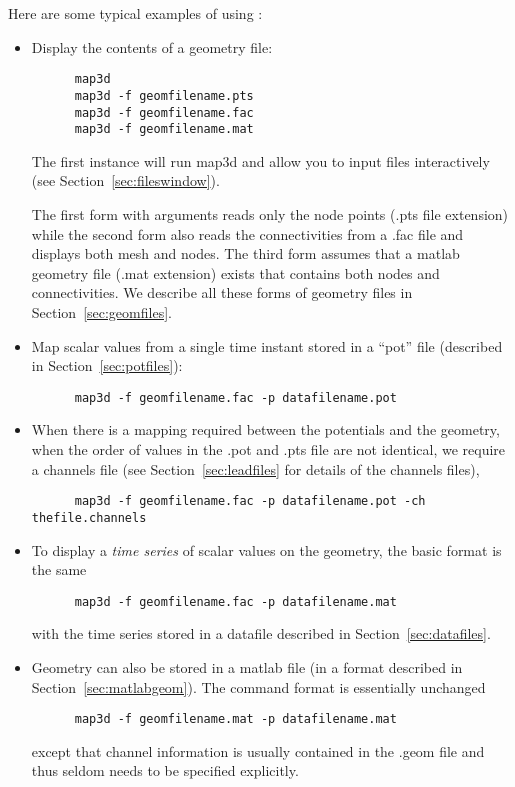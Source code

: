 \noindent
Here are some typical examples of using \map{}:
%
\begin{itemize}
  \item Display the contents of a geometry file:
  \begin{verbatim}
      map3d
      map3d -f geomfilename.pts
      map3d -f geomfilename.fac
      map3d -f geomfilename.mat

  \end{verbatim}
  \vspace{-.2in}
  The first instance will run map3d and allow you to input files interactively
  (see Section~\ref{sec:fileswindow}).
  
  The first form with arguments reads only the node points (.pts file
  extension) while the second form also reads the connectivities from a
  .fac file and displays both mesh and nodes.  The third form assumes that
  a matlab geometry file (.mat extension) exists that contains both nodes
  and connectivities.  We describe all these forms of geometry files in
  Section~\ref{sec:geomfiles}.
  
  \item Map scalar values from a single time instant stored in a ``pot''
  file (described in Section~\ref{sec:potfiles}):
  \begin{verbatim}
      map3d -f geomfilename.fac -p datafilename.pot
  \end{verbatim}

  \item When there is a mapping required between the potentials and the 
  geometry, \eg{} when the order of values in the .pot and .pts file 
  are not identical, we require a channels file (see 
  Section~\ref{sec:leadfiles} for details of the channels files),
  \begin{verbatim}
      map3d -f geomfilename.fac -p datafilename.pot -ch thefile.channels
  \end{verbatim}
   
  \item To display a \emph{time series} of scalar values on the geometry, 
  the basic format is the same
  \begin{verbatim}
      map3d -f geomfilename.fac -p datafilename.mat
  \end{verbatim}
  \vspace{-.2in}
  with the time series stored in a datafile described in
  Section~\ref{sec:datafiles}.

  \item Geometry can also be stored in a matlab file (in a format 
  described in Section~\ref{sec:matlabgeom}).  The command 
  format is essentially unchanged
  \begin{verbatim}
      map3d -f geomfilename.mat -p datafilename.mat
  \end{verbatim}
  \vspace{-.2in}
  except that channel information is usually contained in the .geom 
  file and thus seldom needs to be specified explicitly.
  

\end{itemize}
